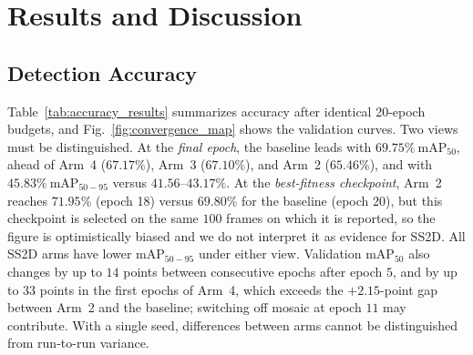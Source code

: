 \section{Results and Discussion}
\label{sec:results}

\subsection{Detection Accuracy}
\label{sec:res_detection}
Table~\ref{tab:accuracy_results} summarizes accuracy after identical 20-epoch budgets, and Fig.~\ref{fig:convergence_map} shows the validation curves. Two views must be distinguished. At the \emph{final epoch}, the baseline leads with $69.75\%\ \text{mAP}_{50}$, ahead of Arm~4 ($67.17\%$), Arm~3 ($67.10\%$), and Arm~2 ($65.46\%$), and with $45.83\%\ \text{mAP}_{50-95}$ versus $41.56$--$43.17\%$. At the \emph{best-fitness checkpoint}, Arm~2 reaches $71.95\%$ (epoch 18) versus $69.80\%$ for the baseline (epoch 20), but this checkpoint is selected on the same $100$ frames on which it is reported, so the figure is optimistically biased and we do not interpret it as evidence for SS2D. All SS2D arms have lower $\text{mAP}_{50-95}$ under either view. Validation $\text{mAP}_{50}$ also changes by up to $14$ points between consecutive epochs after epoch $5$, and by up to $33$ points in the first epochs of Arm~4, which exceeds the $+2.15$-point gap between Arm~2 and the baseline; switching off mosaic at epoch $11$ may contribute. With a single seed, differences between arms cannot be distinguished from run-to-run variance.

